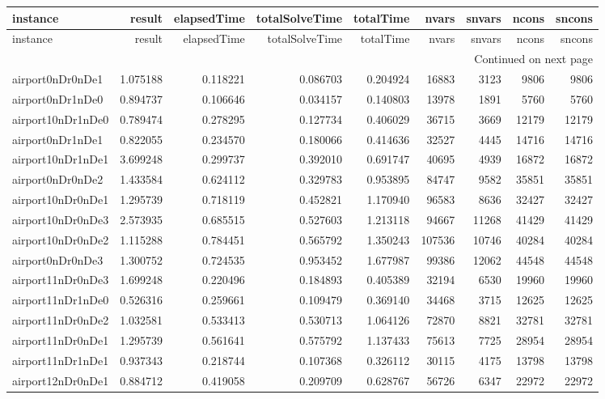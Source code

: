 \documentclass[../../../thesis.tex]{subfiles}
\begin{document}
\tiny
\begin{longtable}{|l|r|r|r|r|r|r|r|r|}
\toprule
instance & result & elapsedTime & totalSolveTime & totalTime & nvars & snvars & ncons & sncons \\
\midrule
\endfirsthead
\toprule
instance & result & elapsedTime & totalSolveTime & totalTime & nvars & snvars & ncons & sncons \\
\midrule
\endhead
\midrule
\multicolumn{9}{r}{Continued on next page} \\
\midrule
\endfoot
\bottomrule
\endlastfoot
airport0nDr0nDe1 & 1.075188 & 0.118221 & 0.086703 & 0.204924 & 16883 & 3123 & 9806 & 9806 \\
airport0nDr1nDe0 & 0.894737 & 0.106646 & 0.034157 & 0.140803 & 13978 & 1891 & 5760 & 5760 \\
airport10nDr1nDe0 & 0.789474 & 0.278295 & 0.127734 & 0.406029 & 36715 & 3669 & 12179 & 12179 \\
airport0nDr1nDe1 & 0.822055 & 0.234570 & 0.180066 & 0.414636 & 32527 & 4445 & 14716 & 14716 \\
airport10nDr1nDe1 & 3.699248 & 0.299737 & 0.392010 & 0.691747 & 40695 & 4939 & 16872 & 16872 \\
airport0nDr0nDe2 & 1.433584 & 0.624112 & 0.329783 & 0.953895 & 84747 & 9582 & 35851 & 35851 \\
airport10nDr0nDe1 & 1.295739 & 0.718119 & 0.452821 & 1.170940 & 96583 & 8636 & 32427 & 32427 \\
airport10nDr0nDe3 & 2.573935 & 0.685515 & 0.527603 & 1.213118 & 94667 & 11268 & 41429 & 41429 \\
airport10nDr0nDe2 & 1.115288 & 0.784451 & 0.565792 & 1.350243 & 107536 & 10746 & 40284 & 40284 \\
airport0nDr0nDe3 & 1.300752 & 0.724535 & 0.953452 & 1.677987 & 99386 & 12062 & 44548 & 44548 \\
airport11nDr0nDe3 & 1.699248 & 0.220496 & 0.184893 & 0.405389 & 32194 & 6530 & 19960 & 19960 \\
airport11nDr1nDe0 & 0.526316 & 0.259661 & 0.109479 & 0.369140 & 34468 & 3715 & 12625 & 12625 \\
airport11nDr0nDe2 & 1.032581 & 0.533413 & 0.530713 & 1.064126 & 72870 & 8821 & 32781 & 32781 \\
airport11nDr0nDe1 & 1.295739 & 0.561641 & 0.575792 & 1.137433 & 75613 & 7725 & 28954 & 28954 \\
airport11nDr1nDe1 & 0.937343 & 0.218744 & 0.107368 & 0.326112 & 30115 & 4175 & 13798 & 13798 \\
airport12nDr0nDe1 & 0.884712 & 0.419058 & 0.209709 & 0.628767 & 56726 & 6347 & 22972 & 22972 \\

\end{longtable}
\end{document}
